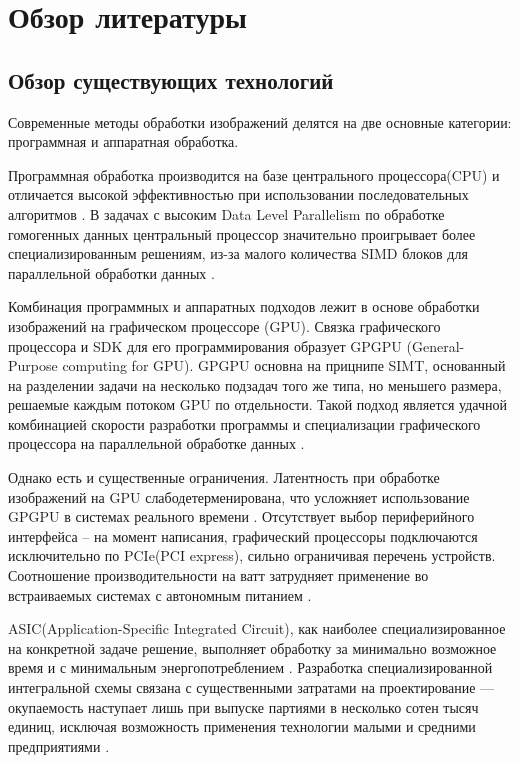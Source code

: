\section{Обзор литературы}
\label{sec:domain}

\subsection{Обзор существующих технологий}
\label{sub:domain:technologies_review}

Современные методы обработки изображений делятся на две основные категории: программная и аппаратная обработка.

Программная обработка производится на базе центрального процессора(CPU) и отличается высокой эффективностью
при использовании последовательных алгоритмов \cite{asano_dip_comp}. В задачах с высоким Data Level Parallelism по обработке гомогенных данных
центральный процессор значительно проигрывает более специализированным решениям,
из-за малого количества SIMD блоков для параллельной обработки данных \cite{axell_cpu_simd}.

Комбинация программных и аппаратных подходов лежит в основе обработки изображений на графическом процессоре (GPU).
Связка графического процессора и SDK для его программирования образует GPGPU (General-Purpose computing for GPU).
GPGPU основна на прицнипе SIMT, основанный на разделении задачи на несколько подзадач того же типа, но меньшего размера,
решаемые каждым потоком GPU по отдельности.
Такой подход является удачной комбинацией скорости разработки программы и специализации графического процессора
на параллельной обработке данных \cite{patterson_hennessy}.

Однако есть и существенные ограничения.
Латентность при обработке изображений на GPU слабодетерменирована, что усложняет использование GPGPU
в системах реального времени \cite{maceina_gpu_real_time}.
Отсутствует выбор периферийного интерфейса -- на момент написания,
графический процессоры подключаются исключительно по PCIe(PCI express), сильно ограничивая перечень устройств.
Соотношение производительности на ватт затрудняет применение во встраиваемых системах с автономным питанием \cite{fowers_gpu_power_consumption}.

ASIC(Application-Specific Integrated Circuit), как наиболее специализированное на конкретной задаче решение, выполняет обработку за минимально возможное время
и с минимальным энергопотреблением \cite{amara_asic_low_power}. Разработка специализированной интегральной схемы связана
с существенными затратами на проектирование --- окупаемость наступает лишь при выпуске партиями в несколько сотен тысяч единиц,
исключая возможность применения технологии малыми и средними предприятиями \cite{smith_asic_economy}.

